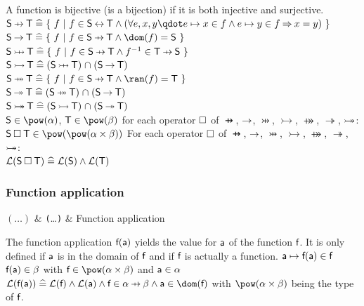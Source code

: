 \begin{samepage}
\begin{rodinrefentry}
  A function is bijective (is a bijection) if it is both injective and surjective.
  \rrdef
  $\exprs \pfun \exprt \defi \{~ f ~|~ f\in \exprs\rel \exprt \land (\forall e,x,y \qdot e\mapsto x\in f \land e\mapsto y\in f \limp x=y) ~\}$\\
  $\exprs \tfun \exprt \defi \{~ f ~|~ f\in \exprs\pfun \exprt \land \dom(f) = \exprs ~\}$\\
  $\exprs \pinj \exprt \defi \{~ f ~|~ f\in \exprs\pfun \exprt \land f^{-1} \in  \exprt\pfun \exprs ~\}$\\
  $\exprs \tinj \exprt \defi (\exprs\pinj \exprt) \binter (\exprs\tfun \exprt)$\\
  $\exprs \psur \exprt \defi \{~ f ~|~ f\in \exprs\pfun \exprt \land \ran(f) = \exprt ~\}$\\
  $\exprs \tsur \exprt \defi (\exprs\psur \exprt) \binter (\exprs\tfun \exprt)$\\
  $\textsf{S} \mathbin{ \rightarrowtail \mkern-18mu\twoheadrightarrow} \textsf{T} \mathrel{\widehat=} (\textsf{S}\mathbin\rightarrowtail \textsf{T}) \mathbin{\mkern1mu\cap\mkern1mu} (\textsf{S}\mathbin\twoheadrightarrow \textsf{T})$\\
  \rrtypes
    $\exprs\in\pow(\alpha)$, $\exprt\in\pow(\beta)$ for each operator $\mathbin{\Box}$ of $\pfun$, $\mathbin\rightarrow$, $\pinj$, $\tinj$, $\psur$, $\tsur$, $\mathbin{ \rightarrowtail \mkern-18mu\twoheadrightarrow}$:\\
  $\exprs \opelipse \exprt \in \pow(\pow(\alpha\cprod\beta))$
  \rrwd
  For each operator $\mathbin{\Box}$ of $\pfun$, $\mathbin\rightarrow$, $\pinj$, $\tinj$, $\psur$, $\tsur$, $\mathbin{ \rightarrowtail \mkern-18mu\twoheadrightarrow}$:\\
  $\mathcal{L}(\textsf{S}\mathbin{\Box} \textsf{T}) \mathrel{\widehat=} \mathcal{L}(\textsf{S}) \land \mathcal{L}(\textsf{T})$
\end{rodinrefentry}
\end{samepage}

\clearpage
\begin{samepage}
\subsubsection{Function application}
\label{function_application}

\begin{rrnames}
  $(\ldots)$  & \texttt{(}\ldots\texttt{)}  & Function application
\end{rrnames}
\begin{rodinrefentry}
  \rrdesc
    The function application $\textsf{f}(\textsf{a})$ yields the value for $\textsf{a}$ of the function $\textsf{f}$.
    It is only defined if $\textsf{a}$ is in the domain of $\textsf{f}$ and if $\textsf{f}$ is actually a function.
  \rrdef
    $\textsf{a}\mapsto\textsf{f}(\textsf{a})\in\textsf{f}$
  \rrtypes
    $\textsf{f}(\textsf{a})\in\beta$ with $\exprlf\in\pow(\alpha\cprod\beta)$ and $\textsf{a}\in\alpha$
  \rrwd
    $\wdl(\exprlf(\exprla))\defi\wdl(\exprlf)\land\wdl(\exprla)\land\exprlf\in\alpha\pfun\beta \land \exprla\in\dom(\exprlf)$
    with $\pow(\alpha\cprod\beta)$ being the type of $\textsf{f}$.
\end{rodinrefentry}
\end{samepage}

